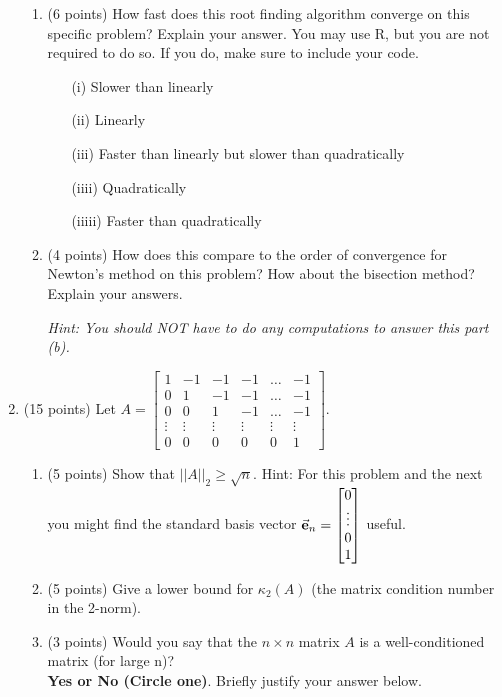 \documentclass[12point]{article}
\def\e{\vec{\bf e}}
\begin{document}
\begin{enumerate}
\begin{enumerate}
	\item (6 points) How fast does this root finding algorithm converge on this specific problem? Explain your answer. You may use R, but you are not required to do so. If you do, make sure to include your code.
	\begin{itemize}
\item[(i)] Slower than linearly
\item[(ii)] Linearly
\item[(iii)] Faster than linearly but slower than quadratically
\item[(iiii)] Quadratically
\item[(iiiii)] Faster than quadratically
\end{itemize}
\vfill

\item (4 points) How does this compare to the order of convergence for Newton's method on this problem? How about the bisection method? Explain your answers. 
\vspace{.05in}

\emph{Hint: You should NOT have to do any computations to answer this part (b).} 
\vfill
 
\end{enumerate}



\newpage


\item (15 points) Let $A=\begin{bmatrix} 1 & -1 & -1 & -1 & \ldots & -1 \\ 0 & 1 & -1 & -1 & \ldots & -1 \\ 0 & 0 & 1 & -1 & \ldots & -1 \\ \vdots & \vdots & \vdots & \vdots & \vdots & \vdots \\ 0 & 0 & 0 & 0 & 0 & 1 \end{bmatrix}$.
\begin{enumerate}
	\item (5 points) Show that $||A||_2 \geq \sqrt{n}$. Hint: For this problem and the next you might find the standard basis vector $\e_n=\begin{bmatrix} 0 \\ \vdots \\ 0 \\ 1 \end{bmatrix} $ useful.
	\vfill
	\item (5 points) Give a lower bound for $\kappa_2(A)$ (the matrix condition number in the 2-norm). 
	\vfill
	\item (3 points) Would you say that the $n \times n$ matrix $A$ is a well-conditioned matrix (for large n)? \\
	\textbf{Yes or No (Circle one)}. Briefly justify your answer below.
	\vspace{1in}
	

\end{enumerate}
\end{enumerate}
\end{document}
